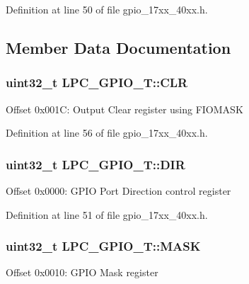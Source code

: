 Definition at line 50 of file gpio\+\_\+17xx\+\_\+40xx.\+h.



\subsection{Member Data Documentation}
\subsubsection[{\texorpdfstring{C\+LR}{CLR}}]{ uint32\+\_\+t L\+P\+C\+\_\+\+G\+P\+I\+O\+\_\+\+T\+::\+C\+LR}\hypertarget{structLPC__GPIO__T_aba8161f685588a1ca79702207083e6ab}{}\label{structLPC__GPIO__T_aba8161f685588a1ca79702207083e6ab}
Offset 0x001C\+: Output Clear register using F\+I\+O\+M\+A\+SK 

Definition at line 56 of file gpio\+\_\+17xx\+\_\+40xx.\+h.

\subsubsection[{\texorpdfstring{D\+IR}{DIR}}]{ uint32\+\_\+t L\+P\+C\+\_\+\+G\+P\+I\+O\+\_\+\+T\+::\+D\+IR}\hypertarget{structLPC__GPIO__T_a753957fa7e1c261e57255c1db8d62bb7}{}\label{structLPC__GPIO__T_a753957fa7e1c261e57255c1db8d62bb7}
Offset 0x0000\+: G\+P\+IO Port Direction control register 

Definition at line 51 of file gpio\+\_\+17xx\+\_\+40xx.\+h.

\subsubsection[{\texorpdfstring{M\+A\+SK}{MASK}}]{ uint32\+\_\+t L\+P\+C\+\_\+\+G\+P\+I\+O\+\_\+\+T\+::\+M\+A\+SK}\hypertarget{structLPC__GPIO__T_a5b0ae096141efd7298aad95ca7b3370e}{}\label{structLPC__GPIO__T_a5b0ae096141efd7298aad95ca7b3370e}
Offset 0x0010\+: G\+P\+IO Mask register 

